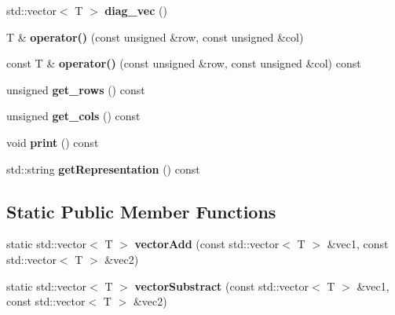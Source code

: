 \begin{DoxyCompactItemize}
std\+::vector$<$ T $>$ {\bfseries diag\+\_\+vec} ()
\item 
\mbox{\label{classQSMatrix_a1f4c4fd8c7a922baab8dd3aea2894aaa}} 
T \& {\bfseries operator()} (const unsigned \&row, const unsigned \&col)
\item 
\mbox{\label{classQSMatrix_a90a37e270405f5138971f4c9cec15af7}} 
const T \& {\bfseries operator()} (const unsigned \&row, const unsigned \&col) const
\item 
\mbox{\label{classQSMatrix_ac544f0aaca9372cb3505001ffbbe25d7}} 
unsigned {\bfseries get\+\_\+rows} () const
\item 
\mbox{\label{classQSMatrix_a6a8375ab09ce7fd394cb72087c2e5dc5}} 
unsigned {\bfseries get\+\_\+cols} () const
\item 
\mbox{\label{classQSMatrix_a4c9d5aadafd932be69a3d8a3f5280e72}} 
void {\bfseries print} () const
\item 
\mbox{\label{classQSMatrix_a2b176f702f48987470eee7d42fe80b0d}} 
std\+::string {\bfseries get\+Representation} () const
\end{DoxyCompactItemize}
\subsection*{Static Public Member Functions}
\begin{DoxyCompactItemize}
\item 
\mbox{\label{classQSMatrix_adce3f956f2f99ba8abf1386783bef07b}} 
static std\+::vector$<$ T $>$ {\bfseries vector\+Add} (const std\+::vector$<$ T $>$ \&vec1, const std\+::vector$<$ T $>$ \&vec2)
\item 
\mbox{\label{classQSMatrix_aacbc52fa3a1d5962de15087e28394c4c}} 
static std\+::vector$<$ T $>$ {\bfseries vector\+Substract} (const std\+::vector$<$ T $>$ \&vec1, const std\+::vector$<$ T $>$ \&vec2)
\end{DoxyCompactItemize}
